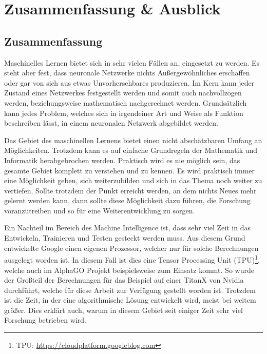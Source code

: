 \chapter{Zusammenfassung \& Ausblick}
\label{cha:ZusammenfassungAusblick}

\section{Zusammenfassung}

\noindent
Maschinelles Lernen bietet sich in sehr vielen Fällen an, eingesetzt zu werden. 
Es steht aber fest, dass neuronale Netzwerke nichts Außergewöhnliches erschaffen oder gar von sich aus etwas Unvorhersehbares produzieren. 
Im Kern kann jeder Zustand eines Netzwerkes festgestellt werden und somit auch nachvollzogen werden, beziehungsweise mathematisch nachgerechnet werden. 
Grundsätzlich kann jedes Problem, welches sich in irgendeiner Art und Weise als Funktion beschreiben lässt, in einem neuronalen Netzwerk abgebildet werden. \newline

\noindent
Das Gebiet des maschinellen Lernens bietet einen nicht abschätzbaren Umfang an Möglichkeiten. 
Trotzdem kann es auf einfache Grundregeln der Mathematik und Informatik herabgebrochen werden. 
Praktisch wird es nie möglich sein, das gesamte Gebiet komplett zu verstehen und zu kennen.
Es wird praktisch immer eine Möglichkeit geben, sich weiterzubilden und sich in das Thema noch weiter zu vertiefen. 
Sollte trotzdem der Punkt erreicht werden, an dem nichts Neues mehr gelernt werden kann, dann sollte diese Möglichkeit dazu führen, die Forschung voranzutreiben und so für eine Weiterentwicklung zu sorgen. \newline

\noindent
Ein Nachteil im Bereich des Machine Intelligence ist, dass sehr viel Zeit in das Entwickeln, Trainieren und Testen gesteckt werden muss. 
Aus diesem Grund entwickelte Google einen eigenen Prozessor, welcher nur für solche Berechnungen ausgelegt worden ist. 
In diesem Fall ist dies eine Tensor Processing Unit (TPU)\footnote{TPU: \url{https://cloudplatform.googleblog.com}}, welche auch im AlphaGO Projekt beispielsweise zum Einsatz kommt. 
So wurde der Großteil der Berechnungen für das Beispiel auf einer TitanX von Nvidia durchführt, welche für diese Arbeit zur Verfügung gestellt worden ist. 
Trotzdem ist die Zeit, in der eine algorithmische Lösung entwickelt wird, meist bei weitem größer.
Dies erklärt auch, warum in diesem Gebiet seit einiger Zeit sehr viel Forschung betrieben wird. 

